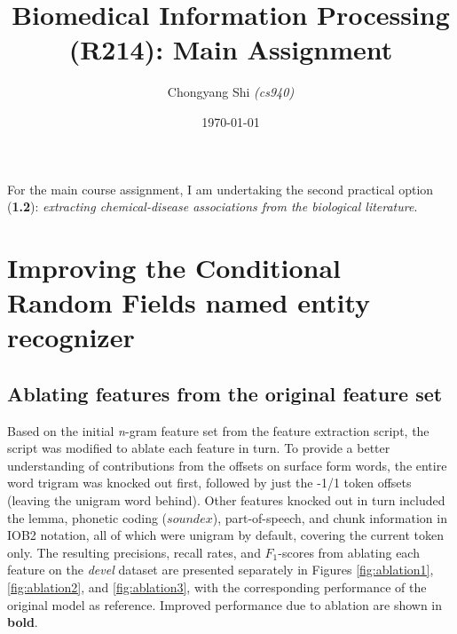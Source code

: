 \documentclass[10pt, oneside]{article}
\title{\vspace{-1cm}Biomedical Information Processing (R214): Main Assignment}
\author{Chongyang Shi \emph{(cs940)}}
\date{\today}
\begin{document}
\maketitle

For the main course assignment, I am undertaking the second practical option (\textbf{1.2}): \emph{extracting chemical-disease associations from the biological literature}.

\section{Improving the Conditional Random Fields named entity recognizer} \label{sec:a-crf-features}
\subsection{Ablating features from the original feature set} \label{subsec:ablating}

Based on the initial \emph{n}-gram feature set from the feature extraction script, the script was modified to ablate each feature in turn. To provide a better understanding of contributions from the offsets on surface form words, the entire word trigram was knocked out first, followed by just the -1/1 token offsets (leaving the unigram word behind). Other features knocked out in turn included the lemma, phonetic coding ($soundex$), part-of-speech, and chunk information in IOB2 notation, all of which were unigram by default, covering the current token only. The resulting precisions, recall rates, and $F_1$-scores from ablating each feature on the \emph{devel} dataset are presented separately in Figures \ref{fig:ablation1}, \ref{fig:ablation2}, and \ref{fig:ablation3}, with the corresponding performance of the original model as reference. Improved performance due to ablation are shown in \textbf{bold}.
\end{document}
